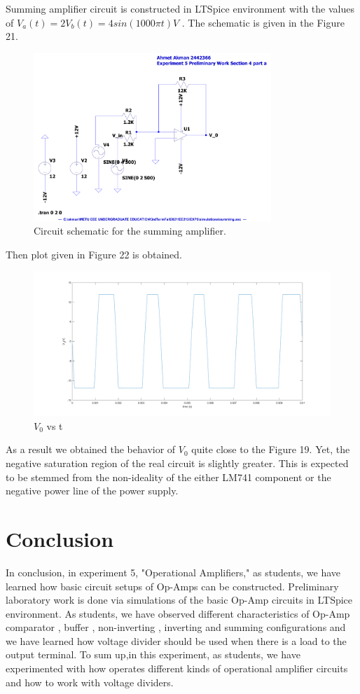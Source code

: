 \documentclass[letterpaper,12pt]{article}
\begin{document}
Summing amplifier circuit is constructed in LTSpice environment with the values of \(V_{a}(t) = 2 V_{b}(t) = 4sin(1000\pi t) V\) . The schematic is given in the Figure 21. 
\begin{figure}[H]
	\centering
   \includegraphics[width=0.8\textwidth]{summing_SCH.pdf}
   \caption{Circuit schematic for the summing amplifier.}
\end{figure} 
Then plot given in Figure 22 is obtained.
\begin{figure}[H]
	\centering
   \includegraphics[width=1\textwidth]{4a_vs_t.png}
   \caption{\(V_0\) vs t}
\end{figure}
As a result we obtained the behavior of \(V_0\) quite close to the Figure 19.  Yet, the negative saturation region of the real circuit is slightly greater. This is expected to be stemmed from the non-ideality of the either LM741 component or the negative power line of the power supply.


\section{Conclusion}
In conclusion, in experiment 5, "Operational Amplifiers," as students, we have learned how basic circuit setups of Op-Amps can be constructed. Preliminary laboratory work is done via simulations of the basic Op-Amp circuits in LTSpice environment. As students, we have observed different characteristics of Op-Amp comparator , buffer , non-inverting , inverting and summing configurations and we have learned how voltage divider should be used when there is a load to the output terminal. To sum up,in this experiment, as students, we have experimented with how operates different kinds of operational amplifier circuits and how to work with voltage dividers. 
\end{document}
